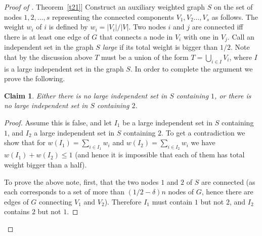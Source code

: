 \documentclass[11pt]{article}
\numberwithin{equation}{section}
\newtheorem{claim}[theorem]{Claim}
\theoremstyle{definition}
\theoremstyle{plain}
\newcommand{\expref}[2]{\hyperref[#2]{#1~\ref{#2}}}
\begin{document}
\begin{proof}[Proof of \expref{Theorem}{t21}]
Construct an auxiliary weighted graph $S$ on the set of nodes 
$1,2,
\ldots ,s$ representing the connected components  $V_1, V_2
\ldots ,V_s$ as follows. The weight $w_i$ of $i$ is defined
by $w_i= {|V_i|}/{|V|}$. Two nodes $i$ and $j$ are
connected iff there is at least one edge  of $G$ that connects a
node in $V_i$  with one in $V_j$. Call an independent set in
the graph $S$ \emph{large} if its total weight is bigger than $1/2$. Note
that by the discussion above $T$ must be a union of the form
%
$T=\bigcup_{i \in I} V_i$,  %
where $I$ is a large independent set in the
graph $S$. In order to complete the argument we prove the following.
\begin{claim}
\label{c24}
Either there is no 
large independent set  in $S$ containing $1$, or there is no
large independent set in $S$ containing $2$.
\end{claim}

\begin{proof}
  Assume this is false, and let $I_1$ be a large independent set in
  $S$ containing $1$, and $I_2$ a large independent set in $S$
  containing $2$. To get a contradiction we show that for
  $ w(I_1)=\sum_{i \in I_1}w_i$ and $w(I_2) =\sum_{i \in I_2} w_i$ we
  have $w(I_1) + w(I_2) \leq 1$ (and hence it is impossible that each
  of them has total weight bigger than a half).

  To prove the above note, first, that the two nodes $1$ and $2$ of
  $S$ are connected (as each corresponds to a set of more than
  $(1/2-\delta)n$ nodes of $G$, hence there are edges of $G$
  connecting $V_1$ and $V_2$). Therefore $I_1$ must contain $1$ but
  not $2$, and $I_2$ contains $2$ but not $1$.


\end{proof}
\end{proof}
\end{document}
